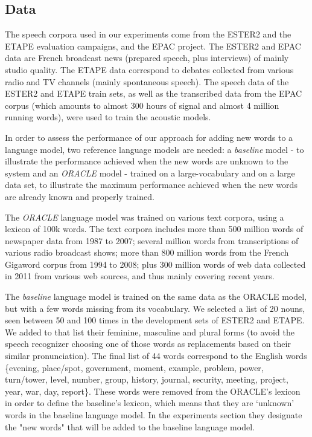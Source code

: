 \documentclass[conference]{IEEEtran}
\begin{document}
\subsection{Data}

The speech corpora used in our experiments come from the ESTER2 \cite{Galliano:2009} and the ETAPE \cite{Gravier:2012} evaluation campaigns, and the EPAC \cite{Esteve:2010} project. 
The ESTER2 and EPAC data are French broadcast news (prepared speech, plus interviews) of mainly studio quality.
The ETAPE data correspond to debates collected from various radio and TV channels (mainly spontaneous speech).
The speech data of the ESTER2 and ETAPE train sets, as well as the transcribed data from the EPAC corpus (which amounts to almost 300 hours of signal and almost 4 million running words), were used to train the acoustic models. 

In order to assess the performance of our approach for adding new words to a language model, two reference language models are needed: a \textit{baseline} model - to illustrate the performance achieved when the new words are unknown to the system and an \textit{ORACLE} model - trained on a large-vocabulary and on a large data set, to illustrate the maximum performance achieved when the new words are already known and properly trained. 

The \textit{ORACLE} language model was trained on various text corpora, using a lexicon of 100k words. 
The text corpora includes more than 500 million words of newspaper data from 1987 to 2007;
several million words from transcriptions of various radio broadcast shows; 
more than 800 million words from the French Gigaword corpus \cite{Mendoca:2011} from 1994 to 2008;
plus 300 million words of web data collected in 2011 from various web sources, and thus mainly covering recent years.

The \textit{baseline} language model is trained on the same data as the ORACLE model, but with a few words missing from its vocabulary. 
We selected a list of 20 nouns, seen between 50 and 100 times in the development sets of ESTER2 and ETAPE. 
We added to that list their feminine, masculine and plural forms (to avoid the speech recognizer choosing one of those words as replacements based on their similar pronunciation). 
The final list of 44 words correspond to the English words \{evening, place/spot, government, moment, example, problem, power, turn/tower, level, number, group, history, journal, security, meeting, project, year, war, day, report\}. 
These words were removed from the ORACLE's lexicon in order to define the baseline's lexicon, which means that they are `unknown' words in the baseline language model.
In the experiments section they designate the "new words" that will be added to the baseline language model.
\end{document}
